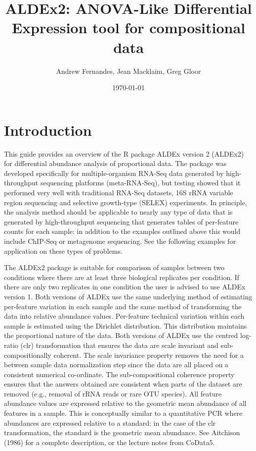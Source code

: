 \documentclass[11pt]{amsart}
\title{ALDEx2: ANOVA-Like Differential Expression tool for compositional data}
\author{Andrew Fernandes, Jean Macklaim, Greg Gloor}
\date{\today}                                           %
\begin{document}
\maketitle

\section{Introduction}
This guide provides an overview of the R package ALDEx version 2 (ALDEx2) for differential abundance analysis of proportional data. The package was developed specifically for multiple-organism RNA-Seq data generated by high-throughput sequencing platforms (meta-RNA-Seq), but testing showed that it performed very well with traditional RNA-Seq datasets, 16S rRNA variable region sequencing and selective growth-type (SELEX) experiments. In principle, the analysis method should be applicable to nearly any type of data that is generated by high-throughput sequencing that generates tables of per-feature counts for each sample: in addition to the examples outlined above this would include  ChIP-Seq or metagenome sequencing. See the following examples for application on these types of problems.

The ALDEx2 package is suitable for comparison of samples between two conditions where there are at least three biological replicates per condition. If there are only two replicates in one condition the user is advised to use ALDEx version 1. Both versions of ALDEx use the same underlying method of estimating per-feature variation in each sample and the same method of transforming the data into relative abundance values. Per-feature technical variation within each sample is estimated using the Dirichlet distribution. This distribution maintains the proportional nature of the data. Both versions of ALDEx use the centred log-ratio (clr) transformation that ensures the data are scale invariant and sub-compositionally coherent\cite{Aitchison:1986}. The scale invariance property removes the need for a between sample data normalization step since the data are all placed on a consistent numerical co-ordinate. The sub-compositional coherence property ensures that the answers obtained are consistent when parts of the dataset are removed (e.g., removal of rRNA reads or rare OTU species). All feature abundance values are expressed relative to the geometric mean abundance of all features in a sample. This is conceptually similar to a quantitative PCR where abundances are expressed relative to a standard: in the case of the clr transformation, the standard is the geometric mean abundance. See Aitchison (1986)\cite{Aitchison:1986} for a complete description, or the lecture notes from CoData5\cite{aitchisonconcise}.
\end{document}
